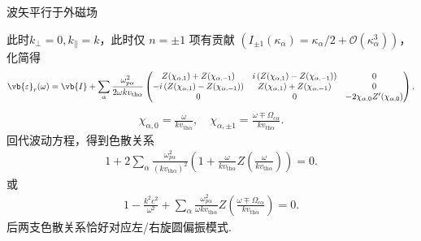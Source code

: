 \begin{exbox}
	波矢平行于外磁场

	此时\(k_\perp=0, k_{\parallel}=k\)，此时仅 \(n=\pm1\) 项有贡献 \(\left(I_{\pm1}(\kappa_\alpha)=\kappa_\alpha/2+\mathcal{O}(\kappa_\alpha^3)\right)\)，化简得
	\begin{align*}
		\vb{\varepsilon}_r(\omega) = \vb{I} + \sum_\alpha\frac{\omega_{p\alpha}^2}{2\omega k v_{\mathrm{th}\alpha}}
		\begin{pmatrix}
			Z(\chi_{\alpha,1})+Z(\chi_{\alpha,-1})                & i\left(Z(\chi_{\alpha,1})-Z(\chi_{\alpha,-1})\right) & 0                                    \\
			-i\left(Z(\chi_{\alpha,1})-Z(\chi_{\alpha,-1})\right) & Z(\chi_{\alpha,1})+Z(\chi_{\alpha,-1})               & 0                                    \\
			0                                                     & 0                                                    & -2\chi_{\alpha,0}Z'(\chi_{\alpha,0})
		\end{pmatrix}.
	\end{align*}
	\begin{align*}
		\chi_{\alpha,0} = \frac{\omega}{k v_{\mathrm{th}\alpha}},\quad \chi_{\alpha,\pm1} = \frac{\omega\mp\Omega_{c\alpha}}{k v_{\mathrm{th}\alpha}}.
	\end{align*}
	回代波动方程，得到色散关系
	\begin{align*}
		1 + 2\sum_\alpha\frac{\omega_{p\alpha}^2}{\left(k v_{\mathrm{th}\alpha}\right)^2}\left(1+\frac{\omega}{k v_{\mathrm{th}\alpha}}Z\left(\frac{\omega}{k v_{\mathrm{th}\alpha}}\right)\right) = 0.
	\end{align*}
	或
	\begin{align*}
		1 - \frac{k^2c^2}{\omega^2} + \sum_\alpha\frac{\omega_{p\alpha}^2}{\omega k v_{\mathrm{th}\alpha}}Z\left(\frac{\omega\mp\Omega_{c\alpha}}{k v_{\mathrm{th}\alpha}}\right) = 0.
	\end{align*}
	后两支色散关系恰好对应左/右旋圆偏振模式.
\end{exbox}

